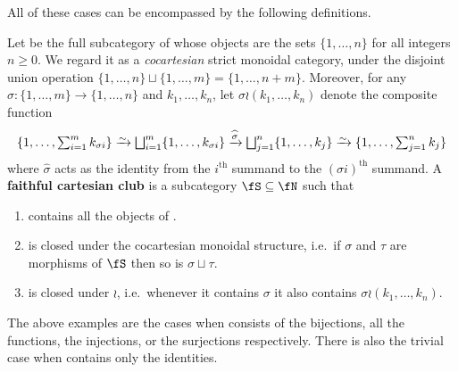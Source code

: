 \documentclass{book}
\begin{document}
All of these cases can be encompassed by the following definitions.

\begin{defn}
  Let \fN be the full subcategory of \bSet whose objects are the sets $\{1,\dots, n\}$ for all integers $n\ge 0$.
  We regard it as a \emph{cocartesian} strict monoidal category, under the disjoint union operation $\{1,\dots,n\} \sqcup \{1,\dots,m\} = \{1,\dots,n+m\}$.
  Moreover, for any $\sigma : \{1,\dots,m\} \to \{1,\dots,n\}$ and $k_1,\dots,k_n$, let $\sigma \wr (k_1,\dots,k_n)$ denote the composite function
  \begin{equation*}
    \{1,\dots,\textstyle\sum_{i=1}^m k_{\sigma i} \}
     \toiso \bigsqcup_{i=1}^m \{1,\dots,k_{\sigma i}\}
     \xto{\widehat{\sigma}} \bigsqcup_{j=1}^n \{1,\dots,k_{j}\}
     \toiso \{1,\dots,\textstyle\sum_{j=1}^n k_j \}
  \end{equation*}
  where $\widehat{\sigma}$ acts as the identity from the $i^{\mathrm{th}}$ summand to the $(\sigma i)^{\mathrm{th}}$ summand.
  A \textbf{faithful cartesian club} is a subcategory $\fS\subseteq \fN$ such that
  \begin{enumerate}
  \item \fS contains all the objects of \fN.
  \item \fS is closed under the cocartesian monoidal structure, i.e.\ if $\sigma$ and $\tau$ are morphisms of $\fS$ then so is $\sigma\sqcup \tau$.
  \item \fS is closed under $\wr$, i.e.\ whenever it contains $\sigma$ it also contains $\sigma \wr (k_1,\dots,k_n)$.
  \end{enumerate}
\end{defn}

The above examples are the cases when \fS consists of the bijections, all the functions, the injections, or the surjections respectively.
There is also the trivial case when \fS contains only the identities.
\end{document}
